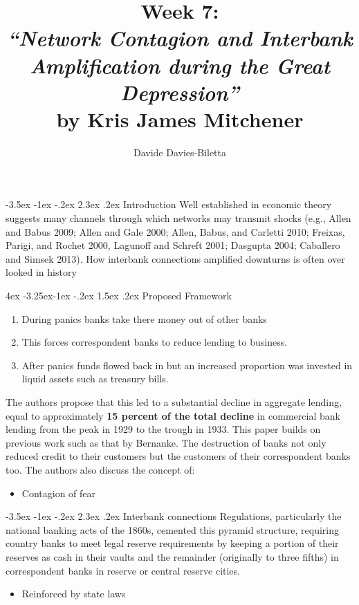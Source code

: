\documentclass[]{article}
\title{Week 7:\\
	 \textit{``Network Contagion and Interbank Amplification during the Great Depression''}\\
	  by Kris James Mitchener}
\author{Davide Davies-Biletta}
\makeatletter
\newcommand{\bb}{\bigbreak\noindent}
\renewcommand\section{\leftskip 0pt\@startsection {section}{1}{\z@}%
	{-3.5ex \@plus -1ex \@minus -.2ex}%
	{2.3ex \@plus.2ex}%
	{\normalfont\Large\bfseries}}
\renewcommand\subsection{\leftskip 4ex\@startsection{subsection}{2}{\z@}%
	{-3.25ex\@plus -1ex \@minus -.2ex}%
	{1.5ex \@plus .2ex}%
	{\normalfont\large\bfseries}}
\makeatother
\begin{document}
\maketitle

\section{Introduction}
 Well established in economic theory suggests many channels through which networks may transmit shocks (e.g., Allen and Babus 2009; Allen and Gale 2000; Allen, Babus, and Carletti 2010; Freixas, Parigi, and Rochet 2000, Lagunoff and Schreft 2001; Dasgupta 2004; Caballero and Simsek 2013).
\bb
How interbank connections amplified downturns is often over looked in history
	
	\subsection{Proposed Framework}
	\begin{enumerate}[leftmargin=10ex]
		\item During  panics banks take there money out of other banks
		\item This forces correspondent banks to reduce lending to business.
		\item After panics funds flowed back in but an increased proportion was invested in liquid assets such as treasury bills.
	\end{enumerate}
	The authors propose that this led to a substantial decline in aggregate lending, equal to approximately \textbf{15 percent of the total decline }in commercial bank lending from the peak in 1929 to the trough in 1933.
	\bb
	This paper builds on previous work such as that by Bernanke. The destruction of banks not only reduced credit to their customers but the customers of their correspondent banks too. 
	\bb
	The authors also discuss the concept of:
	\begin{itemize}[leftmargin=10ex]
		\item Contagion of fear
	\end{itemize}
	



\section{Interbank connections}
Regulations, particularly the national banking acts of the 1860s, cemented this pyramid structure, requiring country banks to meet legal reserve requirements by keeping a portion of their reserves as cash in their vaults and the remainder (originally to three fifths) in correspondent banks in reserve or central reserve cities.
\begin{itemize}
	\item Reinforced by state laws
\end{itemize}
\end{document}
